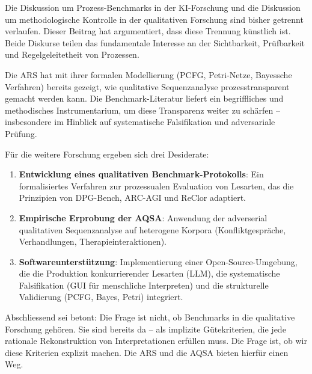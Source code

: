\documentclass[12pt,a4paper]{article}
\begin{document}
Die Diskussion um Prozess-Benchmarks in der KI-Forschung und die Diskussion um methodologische Kontrolle in der qualitativen Forschung sind bisher getrennt verlaufen. Dieser Beitrag hat argumentiert, dass diese Trennung künstlich ist. Beide Diskurse teilen das fundamentale Interesse an der Sichtbarkeit, Prüfbarkeit und Regelgeleitetheit von Prozessen.

Die ARS hat mit ihrer formalen Modellierung (PCFG, Petri-Netze, Bayessche Verfahren) bereits gezeigt, wie qualitative Sequenzanalyse prozesstransparent gemacht werden kann. Die Benchmark-Literatur liefert ein begriffliches und methodisches Instrumentarium, um diese Transparenz weiter zu schärfen – insbesondere im Hinblick auf systematische Falsifikation und adversariale Prüfung.

Für die weitere Forschung ergeben sich drei Desiderate:

\begin{enumerate}
    \item \textbf{Entwicklung eines qualitativen Benchmark-Protokolls}: Ein formalisiertes Verfahren zur prozessualen Evaluation von Lesarten, das die Prinzipien von DPG-Bench, ARC-AGI und ReClor adaptiert.
    
    \item \textbf{Empirische Erprobung der AQSA}: Anwendung der adverserial qualitativen Sequenzanalyse auf heterogene Korpora (Konfliktgespräche, Verhandlungen, Therapieinteraktionen).
    
    \item \textbf{Softwareunterstützung}: Implementierung einer Open-Source-Umgebung, die die Produktion konkurrierender Lesarten (LLM), die systematische Falsifikation (GUI für menschliche Interpreten) und die strukturelle Validierung (PCFG, Bayes, Petri) integriert.
\end{enumerate}

Abschliessend sei betont: Die Frage ist nicht, ob Benchmarks in die qualitative Forschung gehören. Sie sind bereits da – als implizite Gütekriterien, die jede rationale Rekonstruktion von Interpretationen erfüllen muss. Die Frage ist, ob wir diese Kriterien explizit machen. Die ARS und die AQSA bieten hierfür einen Weg.
\end{document}
